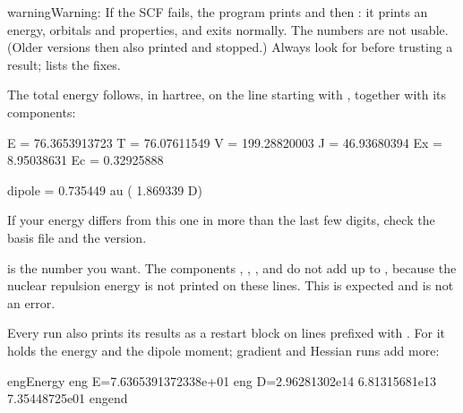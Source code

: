 \documentclass[letterpaper,10pt,english,openany,oneside]{sphinxmanual}
\begin{document}
\begin{sphinxadmonition}{warning}{Warning:}
\sphinxAtStartPar
If the SCF fails, the program prints  and then : it prints an energy, orbitals and
properties, and exits normally. The numbers are not usable. (Older versions then also printed
 and stopped.) Always look for  before trusting a result;
{\hyperref[\detokenize{troubleshooting/common-problems:troubleshooting-common-problems}]{}} lists the fixes.
\end{sphinxadmonition}



\sphinxAtStartPar
The total energy follows, in hartree, on the line starting with , together with its components:

\begin{sphinxVerbatim}[commandchars=\\\{\}]
  E  =     \PYGZhy{}76.3653913723
  T  =      76.07611549  V  =    \PYGZhy{}199.28820003  J  =      46.93680394
  Ex =      \PYGZhy{}8.95038631  Ec =      \PYGZhy{}0.32925888

  dipole =   0.735449 au (  1.869339 D)
\end{sphinxVerbatim}



\sphinxAtStartPar
If your energy differs from this one in more than the last few digits, check the basis file and the version.

\sphinxAtStartPar
{} is the number you want. The components , , ,  and  do not add up to , because the nuclear
repulsion energy is not printed on these lines. This is expected and is not an error.



\sphinxAtStartPar
Every run also prints its results as a restart block on lines prefixed with . For  it holds the
energy and the dipole moment; gradient and Hessian runs add more:

\begin{sphinxVerbatim}[commandchars=\\\{\}]
eng\PYGZgt{}\PYGZdl{}Energy
eng\PYGZgt{} E=\PYGZhy{}7.6365391372338e+01
eng\PYGZgt{} D=\PYGZhy{}2.96281302e\PYGZhy{}14  6.81315681e\PYGZhy{}13 \PYGZhy{}7.35448725e\PYGZhy{}01
eng\PYGZgt{}\PYGZdl{}end
\end{sphinxVerbatim}
\end{document}
